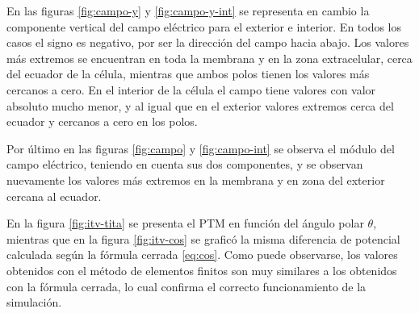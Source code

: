 En las figuras \ref{fig:campo-y} y \ref{fig:campo-y-int} se representa en cambio la componente vertical del campo eléctrico para el exterior e interior. En todos los casos el signo es negativo, por ser la dirección del campo hacia abajo. Los valores más extremos se encuentran en toda la membrana y en la zona extracelular, cerca del ecuador de la célula, mientras que ambos polos tienen los valores más cercanos a cero. En el interior de la célula el campo tiene valores con valor absoluto mucho menor, y al igual que en el exterior valores extremos cerca del ecuador y cercanos a cero en los polos.


Por último en las figuras \ref{fig:campo} y \ref{fig:campo-int} se observa el módulo del campo eléctrico, teniendo en cuenta sus dos componentes, y se observan nuevamente los valores más extremos en la membrana y en zona del exterior cercana al ecuador.

En la figura \ref{fig:itv-tita} se presenta el PTM en función del ángulo polar $\theta$, mientras que en la figura \ref{fig:itv-cos} se graficó la misma diferencia de potencial calculada según la fórmula cerrada \ref{eq:cos}. Como puede observarse, los valores obtenidos con el método de elementos finitos son muy similares a los obtenidos con la fórmula cerrada, lo cual confirma el correcto funcionamiento de la simulación. 

\clearpage






